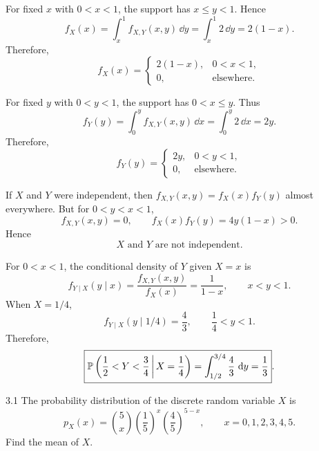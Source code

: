\documentclass[11pt,oneside]{article}
\begin{document}
\begin{solution}
\begin{problemsubparts}
    \item For fixed $x$ with $0<x<1$, the support has $x\leq y<1$. Hence
    \[
        f_X(x)=\int_x^1 f_{X,Y}(x,y)\,\dd y
        =\int_x^1 2\,\dd y
        =2(1-x).
    \]
    Therefore,
    \[
        \boxed{
        f_X(x)=
        \begin{cases}
            2(1-x), & 0<x<1,\\
            0, & \text{elsewhere}.
        \end{cases}}
    \]

    \item For fixed $y$ with $0<y<1$, the support has $0<x\leq y$. Thus
    \[
        f_Y(y)=\int_0^y f_{X,Y}(x,y)\,\dd x
        =\int_0^y 2\,\dd x
        =2y.
    \]
    Therefore,
    \[
        \boxed{
        f_Y(y)=
        \begin{cases}
            2y, & 0<y<1,\\
            0, & \text{elsewhere}.
        \end{cases}}
    \]

    \item If $X$ and $Y$ were independent, then $f_{X,Y}(x,y)=f_X(x)f_Y(y)$ almost everywhere. But for $0<y<x<1$,
    \[
        f_{X,Y}(x,y)=0,
        \qquad
        f_X(x)f_Y(y)=4y(1-x)>0.
    \]
    Hence
    \[
        \boxed{X\text{ and }Y\text{ are not independent}.}
    \]

    \item For $0<x<1$, the conditional density of $Y$ given $X=x$ is
    \[
        f_{Y\mid X}(y\mid x)
        =\frac{f_{X,Y}(x,y)}{f_X(x)}
        =\frac{1}{1-x},
        \qquad x<y<1.
    \]
    When $X=1/4$,
    \[
        f_{Y\mid X}(y\mid1/4)=\frac43,
        \qquad \frac14<y<1.
    \]
    Therefore,
    \[
        \boxed{
        \mathbb{P}\left(\frac12<Y<\frac34\,\middle|\,X=\frac14\right)
        =\int_{1/2}^{3/4}\frac43\,\mathop{}\!\mathrm{d} y
        =\frac13
        }.
    \]
\end{problemsubparts}
\end{solution}

\begin{problem}{3.1}
The probability distribution of the discrete random variable $X$ is
\[
    p_X(x)=\binom{5}{x}
    \left(\frac15\right)^x
    \left(\frac45\right)^{5-x},
    \qquad x=0,1,2,3,4,5.
\]
Find the mean of $X$.
\end{problem}
\end{document}
